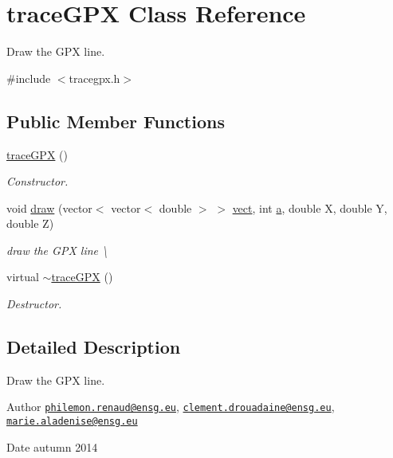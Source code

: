 \hypertarget{classtrace_g_p_x}{\section{trace\+G\+P\+X Class Reference}
\label{classtrace_g_p_x}
}


Draw the G\+P\+X line.  




{\ttfamily \#include $<$tracegpx.\+h$>$}

\subsection*{Public Member Functions}
\begin{DoxyCompactItemize}
\item 
\hyperlink{classtrace_g_p_x_a0334a15533be7581c5c854d2e39191b9}{trace\+G\+P\+X} ()
\begin{DoxyCompactList}\small\item\em Constructor. \end{DoxyCompactList}\item 
void \hyperlink{classtrace_g_p_x_a3143b7f167e97e3b2106113f46ac8f1a}{draw} (vector$<$ vector$<$ double $>$ $>$ \hyperlink{main__opengl_8cpp_ad0d38886963f535e6f051ac2c2ff16d5}{vect}, int \hyperlink{main__opengl_8cpp_aa4c2a5552e9bc49b1816ff532f558c74}{a}, double X, double Y, double Z)
\begin{DoxyCompactList}\small\item\em draw the G\+P\+X line \textbackslash{} \end{DoxyCompactList}\item 
virtual \hyperlink{classtrace_g_p_x_a349d31b7ace681897ec373094f3a7a87}{$\sim$trace\+G\+P\+X} ()
\begin{DoxyCompactList}\small\item\em Destructor. \end{DoxyCompactList}\end{DoxyCompactItemize}


\subsection{Detailed Description}
Draw the G\+P\+X line. 

\begin{DoxyAuthor}{Author}
\href{mailto:philemon.renaud@ensg.eu}{\tt philemon.\+renaud@ensg.\+eu}, \href{mailto:clement.drouadaine@ensg.eu}{\tt clement.\+drouadaine@ensg.\+eu}, \href{mailto:marie.aladenise@ensg.eu}{\tt marie.\+aladenise@ensg.\+eu} 
\end{DoxyAuthor}
\begin{DoxyDate}{Date}
autumn 2014 
\end{DoxyDate}


